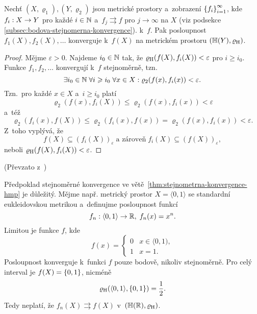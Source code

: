 \begin{theorem}\label{thm:stejnometrna-konvergence-hmp}
    Nechť $(X,\varrho_1),(Y,\varrho_2)$ jsou metrické prostory a~zobrazení $\left\{f_i\right\}_{i=1}^\infty$, kde $f_i:X \rightarrow Y$ pro každé $i\in\mathbb{N}$ a~$f_j\rightrightarrows f$ pro $j\to\infty$ na $X$ (viz podsekce \ref{subsec:bodova-stejnomerna-konvergence}). k~$f$. Pak posloupnost $f_1(X),f_2(X),\ldots$ konverguje k~$f(X)$ na metrickém prostoru $(\mathbb{H}(Y),\varrho_\textup{H})$.
\end{theorem}
\begin{proof}
    Mějme $\varepsilon>0$. Najdeme $i_0\in\mathbb{N}$ tak, že $\varrho_\textup{H}(f(X),f_i(X))<\varepsilon$ pro $i\geqslant i_0$. Funkce $f_1,f_2,\ldots$ konvergují k~$f$ stejnoměrně, tzn.
    \[\exists i_0\in\mathbb{N}\;\forall i\geqslant i_0\;\forall x\in X:\varrho_2(f(x),f_i(x))<\varepsilon.\]
    Tzn.~pro každé $x\in X$ a~$i\geqslant i_0$ platí
    \[\varrho_2(f(x),f_i(X))\leqslant\varrho_2(f(x),f_i(x))<\varepsilon\]
    a~též
    \[\varrho_2(f_i(x),f(X))\leqslant\varrho_2(f_i(x),f(x))=\varrho_2(f(x),f_i(x))<\varepsilon.\]
    Z~toho vyplývá, že
    \[f(X)\subseteq (f_i(X))_\varepsilon\;\text{a zároveň}\;f_i(X)\subseteq (f(X))_\varepsilon,\]
    neboli $\varrho_\textup{H}(f(X),f_i(X))<\varepsilon$.
\end{proof}
(Převzato z~\citep[str. 74]{Edgar2008})
\begin{remark}
    Předpoklad stejnoměrné konvergence ve větě~\ref{thm:stejnometrna-konvergence-hmp} je důležitý. Mějme např. metrický prostor $X=\langle0,1\rangle$ se standardní eukleidovskou metrikou a~definujme posloupnost funkcí
    \[f_n:\langle0,1\rangle \rightarrow \mathbb{R},\;f_n(x)=x^n.\]
    Limitou je funkce $f$, kde
    \[f(x) = \begin{cases}
        0 & x \in \langle0,1),\\
        1 & x = 1.
        \end{cases}\]
    Posloupnost konverguje k~funkci $f$ pouze bodově, nikoliv stejnoměrně. Pro celý interval je $f(X)=\left\{0,1\right\}$, nicméně
    \[\varrho_\textup{H}(\langle0,1\rangle,\left\{0,1\right\})=\dfrac{1}{2}.\]
    Tedy neplatí, že $f_n(X)\rightrightarrows f(X)$ v~$(\mathbb{H}(\mathbb{R}),\varrho_\textup{H})$.
\end{remark}